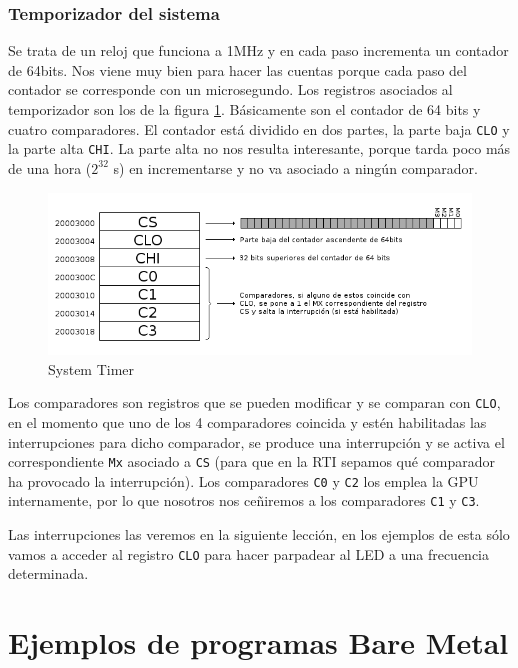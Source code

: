 \subsubsection{Temporizador del sistema}

Se trata de un reloj que funciona a 1MHz y en cada paso incrementa un contador de 64bits. Nos
viene muy bien para hacer las cuentas porque cada paso del contador se corresponde con un
microsegundo. Los registros asociados al temporizador son los de la figura \ref{fig:systim}.
Básicamente son el contador de 64 bits y cuatro comparadores. El contador está dividido en
dos partes, la parte baja {\tt CLO} y la parte alta {\tt CHI}. La parte alta no nos resulta
interesante, porque tarda poco más de una hora ($2^{32}$ \micro s) en incrementarse y no
va asociado a ningún comparador.

\begin{figure}[h]
  \centering
    \includegraphics[width=14cm]{graphs/systemtimer.png}
  \caption{System Timer}
  \label{fig:systim}
\end{figure}

Los comparadores son registros que se pueden modificar y se comparan con {\tt CLO}, en el momento
que uno de los 4 comparadores coincida y estén habilitadas las interrupciones para dicho
comparador, se produce una interrupción y se activa el correspondiente {\tt Mx}
asociado a {\tt CS} (para que en la RTI sepamos qué comparador ha provocado la interrupción).
Los comparadores {\tt C0} y {\tt C2} los emplea la GPU internamente, por lo que nosotros nos
ceñiremos a los comparadores {\tt C1} y {\tt C3}.

Las interrupciones las veremos en la siguiente lección, en los ejemplos de esta sólo vamos
a acceder al registro {\tt CLO} para hacer parpadear al LED a una frecuencia determinada.

\section{Ejemplos de programas Bare Metal}

